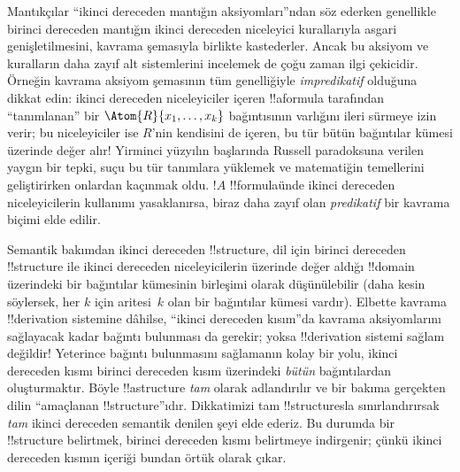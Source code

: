 \documentclass[../../../include/open-logic-section]{subfiles}
\begin{document}
Mantıkçılar ``ikinci dereceden mantığın aksiyomları''ndan söz ederken genellikle
birinci dereceden mantığın ikinci dereceden niceleyici kurallarıyla asgari
genişletilmesini, kavrama şemasıyla birlikte kastederler. Ancak bu aksiyom ve
kuralların daha zayıf alt sistemlerini incelemek de çoğu zaman ilgi çekicidir.
Örneğin kavrama aksiyom şemasının tüm genelliğiyle \emph{impredikatif}
olduğuna dikkat edin: ikinci dereceden niceleyiciler içeren !!a{formula}
tarafından ``tanımlanan'' bir $\Atom{R}{x_1, \dots, x_k}$ bağıntısının varlığını
ileri sürmeye izin verir; bu niceleyiciler ise $R$'nin kendisini de içeren,
bu tür bütün bağıntılar kümesi üzerinde değer alır!{} Yirminci yüzyılın
başlarında Russell paradoksuna verilen yaygın bir tepki, suçu bu tür
tanımlara yüklemek ve matematiğin temellerini geliştirirken onlardan kaçınmak
oldu. $!A$ !!{formula}{}ünde ikinci dereceden niceleyicilerin kullanımı
yasaklanırsa, biraz daha zayıf olan {\em predikatif} bir kavrama biçimi elde
edilir.

Semantik bakımdan ikinci dereceden !!{structure}, dil için birinci dereceden
!!{structure} ile ikinci dereceden niceleyicilerin üzerinde değer aldığı
!!{domain} üzerindeki bir bağıntılar kümesinin birleşimi olarak düşünülebilir
(daha kesin söylersek, her $k$ için aritesi~$k$ olan bir bağıntılar kümesi
vardır). Elbette kavrama !!{derivation} sistemine dâhilse, ``ikinci dereceden
kısım''da kavrama aksiyomlarını sağlayacak kadar bağıntı bulunması da gerekir;
yoksa !!{derivation} sistemi sağlam değildir!{} Yeterince bağıntı bulunmasını
sağlamanın kolay bir yolu, ikinci dereceden kısmı birinci dereceden kısım
üzerindeki \emph{bütün} bağıntılardan oluşturmaktır. Böyle !!a{structure}
\emph{tam} olarak adlandırılır ve bir bakıma gerçekten dilin ``amaçlanan
!!{structure}''ıdır. Dikkatimizi tam !!{structure}s{}la sınırlandırırsak
\emph{tam} ikinci dereceden semantik denilen şeyi elde ederiz. Bu durumda bir
!!{structure} belirtmek, birinci dereceden kısmı belirtmeye indirgenir; çünkü
ikinci dereceden kısmın içeriği bundan örtük olarak çıkar.
\end{document}
